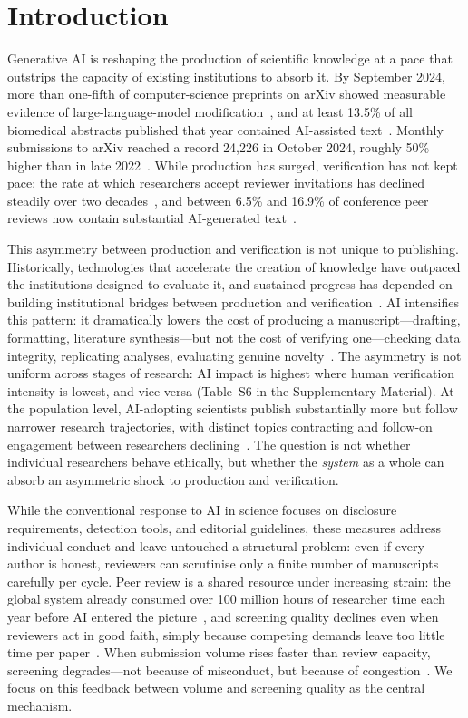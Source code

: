 \documentclass{article}
\begin{document}
\section{Introduction}

Generative AI is reshaping the production of scientific knowledge at a pace that outstrips the capacity of existing institutions to absorb it.
By September 2024, more than one-fifth of computer-science preprints on arXiv showed measurable evidence of large-language-model modification~\citep{Liang2025}, and at least 13.5\% of all biomedical abstracts published that year contained AI-assisted text~\citep{Kobak2025}.
Monthly submissions to arXiv reached a record 24{,}226 in October 2024, roughly 50\% higher than in late 2022~\citep{arXiv2024}.
While production has surged, verification has not kept pace: the rate at which researchers accept reviewer invitations has declined steadily over two decades~\citep{Meyerson2025}, and between 6.5\% and 16.9\% of conference peer reviews now contain substantial AI-generated text~\citep{Liang2024ICML}.

This asymmetry between production and verification is not unique to publishing.
Historically, technologies that accelerate the creation of knowledge have outpaced the institutions designed to evaluate it, and sustained progress has depended on building institutional bridges between production and verification~\citep{Mokyr2002, Walker2026}.
AI intensifies this pattern: it dramatically lowers the cost of producing a manuscript---drafting, formatting, literature synthesis---but not the cost of verifying one---checking data integrity, replicating analyses, evaluating genuine novelty~\citep{Walker2026, Checco2021}.
The asymmetry is not uniform across stages of research: AI impact is highest where human verification intensity is lowest, and vice versa (Table~S6 in the Supplementary Material).
At the population level, AI-adopting scientists publish substantially more but follow narrower research trajectories, with distinct topics contracting and follow-on engagement between researchers declining~\citep{HaoXuLiEvans2026}.
The question is not whether individual researchers behave ethically, but whether the \emph{system} as a whole can absorb an asymmetric shock to production and verification.

While the conventional response to AI in science focuses on disclosure requirements, detection tools, and editorial guidelines, these measures address individual conduct and leave untouched a structural problem: even if every author is honest, reviewers can scrutinise only a finite number of manuscripts carefully per cycle.
Peer review is a shared resource under increasing strain: the global system already consumed over 100 million hours of researcher time each year before AI entered the picture~\citep{Kovanis2016, Aczel2021}, and screening quality declines even when reviewers act in good faith, simply because competing demands leave too little time per paper~\citep{Bianchi2018}.
When submission volume rises faster than review capacity, screening degrades---not because of misconduct, but because of congestion~\citep{Bianchi2018}.
We focus on this feedback between volume and screening quality as the central mechanism.
\end{document}
